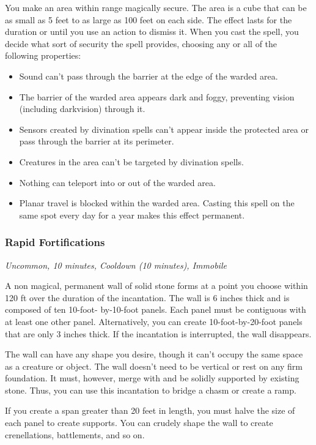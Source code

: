You make an area within range magically secure. The area is a cube that can be as small as 5 feet to as large as 100 feet on each side. The effect lasts for the duration or until you use an action to dismiss it. When you cast the spell, you decide what sort of security the spell provides, choosing any or all of the following properties:
\begin{itemize}
\item Sound can't pass through the barrier at the edge of the warded area.
\item The barrier of the warded area appears dark and foggy, preventing vision (including darkvision) through it.
\item Sensors created by divination spells can't appear inside the protected area or pass through the barrier at its perimeter.
\item Creatures in the area can't be targeted by divination spells.
\item Nothing can teleport into or out of the warded area.
\item Planar travel is blocked within the warded area. Casting this spell on the same spot every day for a year makes this effect permanent.
\end{itemize}

\subsubsection{Rapid Fortifications}
\textit{Uncommon, 10 minutes, Cooldown (10 minutes), Immobile}

A non magical, permanent wall of solid stone forms at a point you choose within 120 ft over the duration of the incantation. The wall is 6 inches thick and is composed of ten 10-foot- by-10-foot panels. Each panel must be contiguous with at least one other panel. Alternatively, you can create 10-foot-by-20-foot panels that are only 3 inches thick. If the incantation is interrupted, the wall disappears.

The wall can have any shape you desire, though it can't occupy the same space as a creature or object. The wall doesn't need to be vertical or rest on any firm foundation. It must, however, merge with and be solidly supported by existing stone. Thus, you can use this incantation to bridge a chasm or create a ramp.

If you create a span greater than 20 feet in length, you must halve the size of each panel to create supports. You can crudely shape the wall to create crenellations, battlements, and so on.

